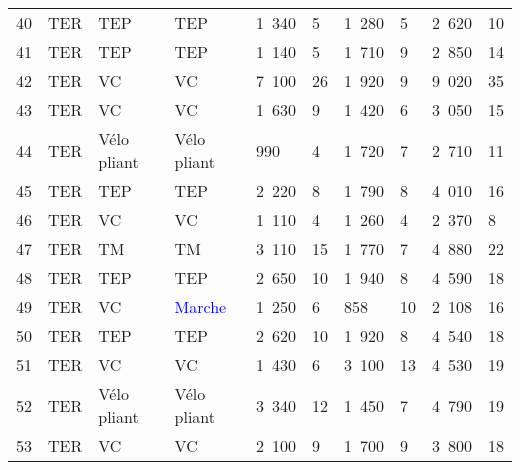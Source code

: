 \begin{longtable}{p{0.7cm}p{1.4cm}p{1.4cm}p{1.6cm}p{0.8cm}p{0.8cm}p{0.8cm}p{0.8cm}p{1.1cm}p{1.1cm}}
    \small{40} & \small{TER} & \small{TEP} & \small{TEP} & \small{1~340} & \small{5} & \small{1~280} & \small{5} & \small{2~620} & \small{10} \\
    \small{41} & \small{TER} & \small{TEP} & \small{TEP} & \small{1~140} & \small{5} & \small{1~710} & \small{9} & \small{2~850} & \small{14} \\
    \small{42} & \small{TER} & \small{VC} & \small{VC} & \small{7~100} & \small{26} & \small{1~920} & \small{9} & \small{9~020} & \small{35} \\
    \small{43} & \small{TER} & \small{VC} & \small{VC} & \small{1~630} & \small{9} & \small{1~420} & \small{6} & \small{3~050} & \small{15} \\
    \small{44} & \small{TER} & \small{Vélo pliant} & \small{Vélo pliant} & \small{990} & \small{4} & \small{1~720} & \small{7} & \small{2~710} & \small{11} \\
    \small{45} & \small{TER} & \small{TEP} & \small{TEP} & \small{2~220} & \small{8} & \small{1~790} & \small{8} & \small{4~010} & \small{16} \\
    \small{46} & \small{TER} & \small{VC} & \small{VC} & \small{1~110} & \small{4} & \small{1~260} & \small{4} & \small{2~370} & \small{8} \\
    \small{47} & \small{TER} & \small{TM} & \small{TM} & \small{3~110} & \small{15} & \small{1~770} & \small{7} & \small{4~880} & \small{22} \\
    \small{48} & \small{TER} & \small{TEP} & \small{TEP} & \small{2~650} & \small{10} & \small{1~940} & \small{8} & \small{4~590} & \small{18} \\
    \small{49} & \small{TER} & \small{VC} & \small{\textcolor{blue}{Marche}} & \small{1~250} & \small{6} & \small{858} & \small{10} & \small{2~108} & \small{16} \\
    \small{50} & \small{TER} & \small{TEP} & \small{TEP} & \small{2~620} & \small{10} & \small{1~920} & \small{8} & \small{4~540} & \small{18} \\
    \small{51} & \small{TER} & \small{VC} & \small{VC} & \small{1~430} & \small{6} & \small{3~100} & \small{13} & \small{4~530} & \small{19} \\
    \small{52} & \small{TER} & \small{Vélo pliant} & \small{Vélo pliant} & \small{3~340} & \small{12} & \small{1~450} & \small{7} & \small{4~790} & \small{19} \\
    \small{53} & \small{TER} & \small{VC} & \small{VC} & \small{2~100} & \small{9} & \small{1~700} & \small{9} & \small{3~800} & \small{18} \\

\end{longtable}
